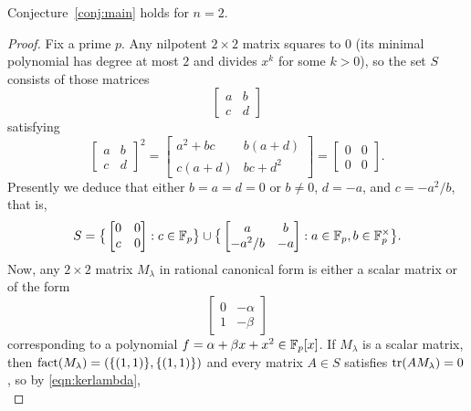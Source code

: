 \begin{prop}
\label{prop:2by2case}
Conjecture~\ref{conj:main} holds for $n=2$.
\end{prop}
\begin{proof}
Fix a prime $p$. Any nilpotent $2\times 2$ matrix squares to $0$ (its minimal polynomial has degree at most $2$ and divides $x^k$ for some $k>0$), so the set $S$ consists of those matrices
\begin{equation*}
\begin{bmatrix}
a&b\\
c&d
\end{bmatrix}
\end{equation*}
satisfying
\begin{equation}
\label{eqn:squarezero}
\begin{bmatrix}
a&b\\
c&d
\end{bmatrix}^2
=
\begin{bmatrix}
a^2+bc&b(a+d)\\
c(a+d)&bc+d^2
\end{bmatrix}
=
\begin{bmatrix}
0&0\\
0&0
\end{bmatrix}.
\end{equation}
Presently we deduce that either $b=a=d=0$ or $b\ne 0$, $d=-a$, and $c=-a^2/b$, that is,
\begin{equation}
\label{eqn:nilptwo}
S=\big\{\begin{bmatrix}
0&0\\
c&0
\end{bmatrix}:c\in\mathbb{F}_p\big\}\cup\big\{\begin{bmatrix}
a&b\\
-a^2/b&-a
\end{bmatrix}:a\in\mathbb{F}_p,b\in\mathbb{F}_p^\times\big\}.
\end{equation}
Now, any $2\times 2$ matrix $M_\lambda$ in rational canonical form is either a scalar matrix or of the form
\begin{equation}
\label{eqn:rcftwo}
\begin{bmatrix}
0&-\alpha\\
1&-\beta
\end{bmatrix}
\end{equation}
corresponding to a polynomial $f=\alpha+\beta x+x^2\in\mathbb{F}_p[x]$. If $M_\lambda$ is a scalar matrix, then $\operatorname{fact}(M_\lambda)=(\{(1,1)\},\{(1,1)\})$ and every matrix $A\in S$ satisfies $\operatorname{tr}(AM_\lambda)=0$, so by \eqref{eqn:kerlambda},
\begin{equation*}

\end{equation*}
\end{proof}
